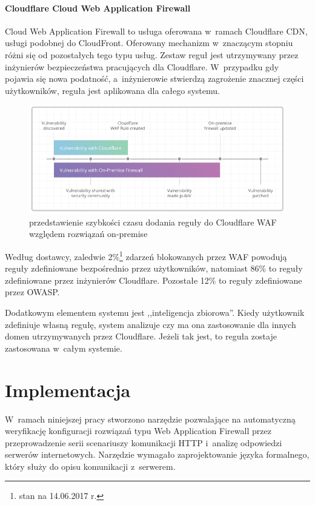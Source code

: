 \documentclass[12pt,a4paper,polish,thesis]{dcsbook}
\begin{document}
\subsubsection{Cloudflare Cloud Web Application Firewall}
Cloud Web Application Firewall to usługa oferowana w~ramach Cloudflare CDN, usługi podobnej do CloudFront. Oferowany mechanizm w~znaczącym stopniu różni się od pozostałych tego typu usług. Zestaw reguł jest utrzymywany przez inżynierów bezpieczeństwa pracujących dla Cloudflare. W~przypadku gdy pojawia się nowa podatność, a~inżynierowie stwierdzą zagrożenie znacznej części użytkowników, reguła jest aplikowana dla całego systemu.

\begin{figure}[h]
\centering
\includegraphics[scale=0.7]{cloudflare}

\caption{przedstawienie szybkości czasu dodania reguły do Cloudflare WAF względem rozwiązań on-premise \cite{cloudflarewaf}}
\label{fig:cloudflare}
\end{figure}

Według dostawcy, zaledwie 2\%\footnote{stan na 14.06.2017 r.} zdarzeń blokowanych przez WAF powodują reguły zdefiniowane bezpośrednio przez użytkowników, natomiast 86\% to reguły zdefiniowane przez inżynierów Cloudflare. Pozostałe 12\% to reguły zdefiniowane przez OWASP.

Dodatkowym elementem systemu jest ,,inteligencja zbiorowa''. Kiedy użytkownik zdefiniuje własną regułę, system analizuje czy ma ona zastosowanie dla innych domen utrzymywanych przez Cloudflare. Jeżeli tak jest, to reguła zostaje zastosowana w~całym systemie.



\chapter{Implementacja}
 W~ramach niniejszej pracy stworzono narzędzie pozwalające na automatyczną weryfikację konfiguracji rozwiązań typu Web Application Firewall przez przeprowadzenie serii scenariuszy komunikacji HTTP i~analizę odpowiedzi serwerów internetowych. Narzędzie wymagało zaprojektowanie języka formalnego, który służy do opisu komunikacji z~serwerem. 
\end{document}
